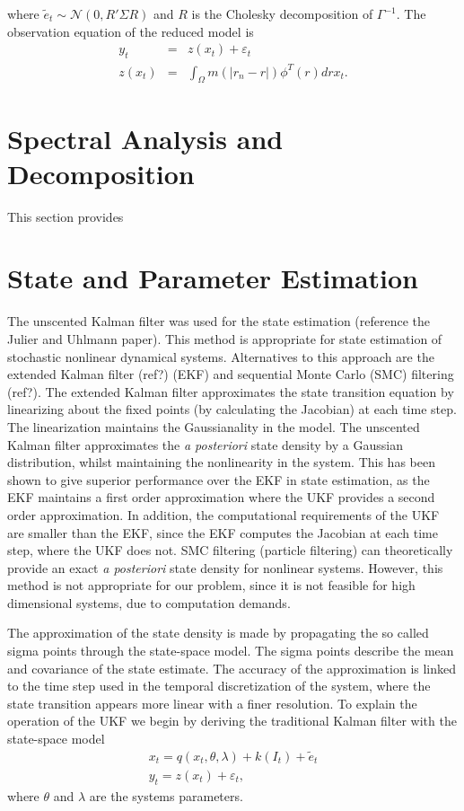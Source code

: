 \documentclass[onecolumn,draftcls]{IEEEtran}
\begin{document}
where $\tilde{e}_t \sim \mathcal{N}\left(0,R' \Sigma R\right)$ and $R$ is the Cholesky decomposition of $\Gamma^{-1}$. The observation equation of the reduced model is
\begin{eqnarray}\label{ObservationEquation}
    y_t &=& z\left(x_t\right) + \varepsilon_t \\
	z\left(x_t\right) &=& \int_\Omega m\left(|r_n-r|\right)\phi^T\left(r\right) dr x_t.
\end{eqnarray}

\section{Spectral Analysis and Decomposition}
This section provides


\section{State and Parameter Estimation}
The unscented Kalman filter was used for the state estimation (reference the Julier and Uhlmann paper). This method is appropriate for state estimation of stochastic nonlinear dynamical systems. Alternatives to this approach are the extended Kalman filter (ref?) (EKF) and sequential Monte Carlo (SMC) filtering (ref?). The extended Kalman filter approximates the state transition equation by linearizing about the fixed points (by calculating the Jacobian) at each time step. The linearization maintains the Gaussianality in the model. The unscented Kalman filter approximates the \emph{a posteriori} state density by a Gaussian distribution, whilst maintaining the nonlinearity in the system. This has been shown to give superior performance over the EKF in state estimation, as the EKF maintains a first order approximation where the UKF provides a second order approximation. In addition, the computational requirements of the UKF are smaller than the EKF, since the EKF computes the Jacobian at each time step, where the UKF does not. SMC filtering (particle filtering) can theoretically provide an exact \emph{a posteriori} state density for nonlinear systems. However, this method is not appropriate for our problem, since it is not feasible for high dimensional systems, due to computation demands.

The approximation of the state density is made by propagating the so called sigma points through the state-space model. The sigma points describe the mean and covariance of the state estimate. The accuracy of the approximation is linked to the time step used in the temporal discretization of the system, where the state transition appears more linear with a finer resolution. To explain the operation of the UKF we begin by deriving the traditional Kalman filter with the state-space model
\begin{eqnarray}
	x_t = q(x_t,\theta,\lambda) + k(I_t) + \tilde{e}_t \\
	y_t = z(x_t) + \varepsilon_t,
\end{eqnarray}
where $\theta$ and $\lambda$ are the systems parameters. 
\end{document}
